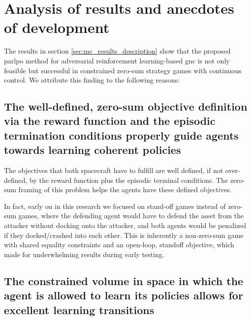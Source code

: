

\section{Analysis of results and anecdotes of development}
\label{sec:analysis-and-anecdotes}

The results in section \ref{sec:mc_results_description} show that the proposed \acs{parlpo} method for adversarial reinforcement learning-based \acs{gnc} is not only feasible but successful in constrained zero-sum strategy games with continuous control. We attribute this finding to the following reasons:

\subsection*{The well-defined, zero-sum objective definition via the reward function and the episodic termination conditions properly guide agents towards learning coherent policies}

The objectives that both spacecraft have to fulfill are well defined, if not over-defined, by the reward function plus the episodic terminal conditions. The zero-sum framing of this problem helps the agents have these defined objectives.
    
In fact, early on in this research we focused on stand-off games instead of zero-sum games, where the defending agent would have to defend the asset from the attacker without docking onto the attacker, and both agents would be penalized if they docked/crashed into each other. This is inherently a non-zero-sum game with shared equality constraints and an open-loop, standoff objective, which made for underwhelming results during early testing.

\subsection*{The constrained volume in space in which the agent is allowed to learn its policies allows for excellent learning transitions}


